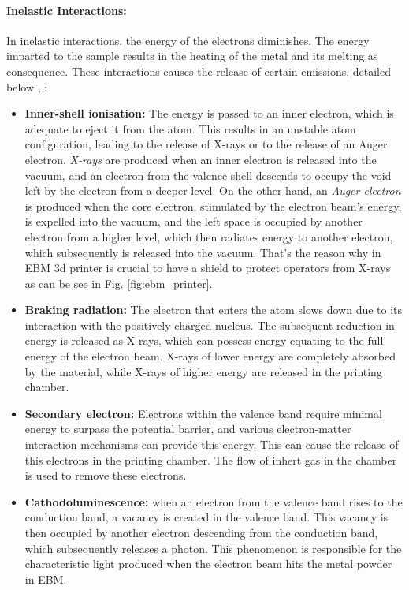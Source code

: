 \paragraph{Inelastic Interactions:} In inelastic interactions, the energy of the electrons diminishes. The energy imparted to the sample results in the heating of the metal and its melting as consequence. These interactions causes the release of certain emissions, detailed below \cite{krumeich_properties_nodate}, \cite{goldstein_scanning_2018}:
\begin{itemize}
    \item \textbf{Inner-shell ionisation:} The energy is passed to an inner electron, which is adequate to eject it from the atom. This results in an unstable atom configuration, leading to the release of X-rays or to the release of an Auger electron. \emph{X-rays} are produced when an inner electron is released into the vacuum, and an electron from the valence shell descends to occupy the void left by the electron from a deeper level. On the other hand, an \emph{Auger electron} is produced when the core electron, stimulated by the electron beam's energy, is expelled into the vacuum, and the left space is occupied by another electron from a higher level, which then radiates energy to another electron, which subsequently is released into the vacuum. That's the reason why in EBM 3d printer is crucial to have a shield to protect operators from X-rays as can be see in Fig. \ref{fig:ebm_printer}.
    \item \textbf{Braking radiation:} The electron that enters the atom slows down due to its interaction with the positively charged nucleus. The subsequent reduction in energy is released as X-rays, which can possess energy equating to the full energy of the electron beam. X-rays of lower energy are completely absorbed by the material, while X-rays of higher energy are released in the printing chamber.
    \item \textbf{Secondary electron:} Electrons within the valence band require minimal energy to surpass the potential barrier, and various electron-matter interaction mechanisms can provide this energy. This can cause the release of this electrons in the printing chamber. The flow of inhert gas in the chamber is used to remove these electrons.
    \item \textbf{Cathodoluminescence:} when an electron from the valence band rises to the conduction band, a vacancy is created in the valence band. This vacancy is then occupied by another electron descending from the conduction band, which subsequently releases a photon. This phenomenon is responsible for the characteristic light produced when the electron beam hits the metal powder in EBM. 

\end{itemize}
